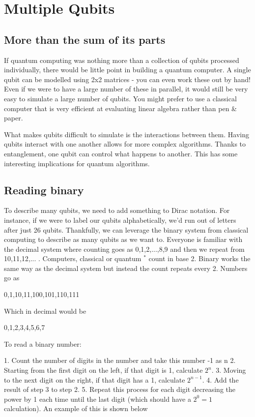 \chapter{Multiple Qubits}

\section{ More than the sum of its parts}

If quantum computing was nothing more than a collection of qubits processed individually, there would be little point in building a quantum computer. A single qubit can be modelled using 2x2 matrices - you can even work these out by hand! Even if we were to have a large number of these in parallel, it would still be very easy to simulate a large number of qubits. You might prefer to use a classical computer that is very efficient at evaluating linear algebra rather than pen \& paper. 

What makes qubits difficult to simulate is the interactions between them. Having qubits interact with one another allows for more complex algorithms. Thanks to entanglement, one qubit can control what happens to another. This has some interesting implications for quantum algorithms. 

\section{Reading binary}

To describe many qubits, we need to add something to Dirac notation. For instance, if we were to label our qubits alphabetically, we'd run out of letters after just 26 qubits. Thankfully, we can leverage the binary system from classical computing to describe as many qubits as we want to. Everyone is familiar with the decimal system where counting goes as 0,1,2,...,8,9 and then we repeat from 10,11,12,... . Computers, classical or quantum $^*$ count in base 2. Binary works the same way as the decimal system but instead the count repeats every 2. Numbers go as    

0,1,10,11,100,101,110,111 

Which in decimal would be 

0,1,2,3,4,5,6,7 

To read a binary number:  
  
1. Count the number of digits in the number and take this number -1 as n
2. Starting from the first digit on the left, if that digit is 1, calculate $2^n$. 
3. Moving to the next digit on the right, if that digit has a 1, calculate $2^{n-1}$. 
4. Add the result of step 3 to step 2. 
5. Repeat this process for each digit decreasing the power by 1 each time until the last digit (which should have a $2^0 = 1$ calculation). An example of this is shown below


